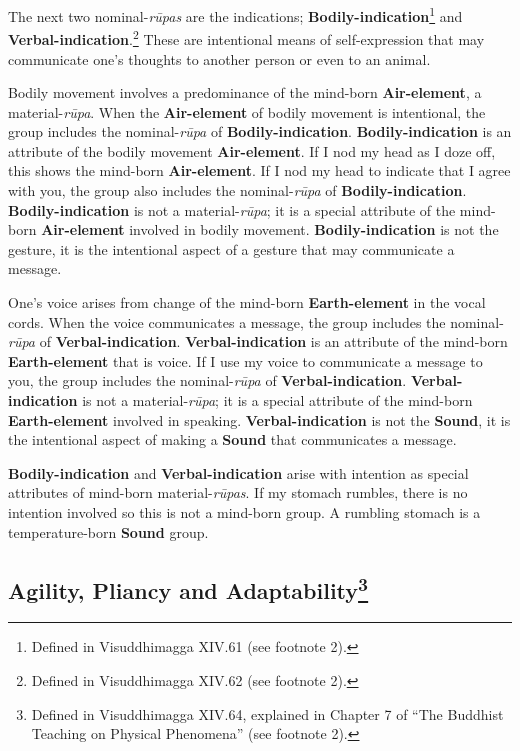 The next two nominal-\textit{rūpas} are the indications; \textbf{Bodily-indication}\footnote{Defined in Visuddhimagga XIV.61 (see footnote 2).} and \textbf{Verbal-indication}.\footnote{Defined in Visuddhimagga XIV.62 (see footnote 2).} These are intentional means of self-expression that may communicate one’s thoughts to another person or even to an animal.

Bodily movement involves a predominance of the mind-born \textbf{Air-element}, a material-\textit{rūpa}. When the \textbf{Air-element} of bodily movement is intentional, the group includes the nominal-\textit{rūpa} of \textbf{Bodily-indication}. \textbf{Bodily-indication} is an attribute of the bodily movement \textbf{Air-element}. If I nod my head as I doze off, this shows the mind-born \textbf{Air-element}. If I nod my head to indicate that I agree with you, the group also includes the nominal-\textit{rūpa} of \textbf{Bodily-indication}. \textbf{Bodily-indication} is not a material-\textit{rūpa}; it is a special attribute of the mind-born \textbf{Air-element} involved in bodily movement. \textbf{Bodily-indication} is not the gesture, it is the intentional aspect of a gesture that may communicate a message.

One’s voice arises from change of the mind-born \textbf{Earth-element} in the vocal cords. When the voice communicates a message, the group includes the nominal-\textit{rūpa} of \textbf{Verbal-indication}. \textbf{Verbal-indication} is an attribute of the mind-born \textbf{Earth-element} that is voice. If I use my voice to communicate a message to you, the group includes the nominal-\textit{rūpa} of \textbf{Verbal-indication}. \textbf{Verbal-indication} is not a material-\textit{rūpa}; it is a special attribute of the mind-born \textbf{Earth-element} involved in speaking. \textbf{Verbal-indication} is not the \textbf{Sound}, it is the intentional aspect of making a \textbf{Sound} that communicates a message.

\textbf{Bodily-indication} and \textbf{Verbal-indication} arise with intention as special attributes of mind-born material-\textit{rūpas}. If my stomach rumbles, there is no intention involved so this is not a mind-born group. A rumbling stomach is a temperature-born \textbf{Sound} group.

\subsection*{Agility, Pliancy and Adaptability\footnote{Defined in Visuddhimagga XIV.64, explained in Chapter 7 of “The Buddhist Teaching on Physical Phenomena” (see footnote 2).}}

